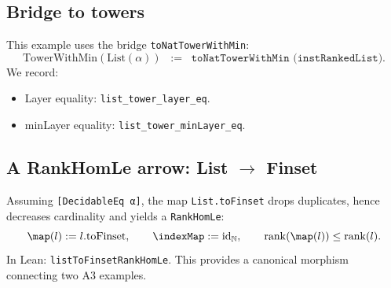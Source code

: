\subsection{Bridge to towers}
This example uses the bridge \texttt{toNatTowerWithMin}:
\[
  \mathrm{TowerWithMin}(\mathrm{List}(\alpha)) \;\;:=\;\; \texttt{toNatTowerWithMin (instRankedList)}.
\]
We record:
\begin{itemize}
\item Layer equality: \texttt{list\_tower\_layer\_eq}.
\item minLayer equality: \texttt{list\_tower\_minLayer\_eq}.
\end{itemize}

\subsection{A RankHomLe arrow: List \texorpdfstring{$\to$}{->} Finset}
Assuming \texttt{[DecidableEq α]}, the map \texttt{List.toFinset} drops duplicates, hence decreases
cardinality and yields a \texttt{RankHomLe}:
\[
  \map(l) := l.\mathrm{toFinset},\qquad \indexMap := \mathrm{id}_{\mathbb{N}},\qquad
  \rank(\map(l)) \le \rank(l).
\]
In Lean: \texttt{listToFinsetRankHomLe}. This provides a canonical morphism connecting two A3 examples.
